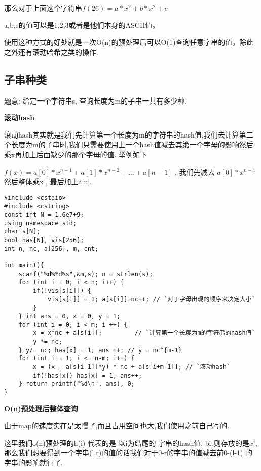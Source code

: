 那么对于上面这个字符串$f(26) = a*x^{2} + b*x^{2} + c$

a,b,c的值可以是1,2,3或者是他们本身的ASCII值。

使用这种方式的好处就是一次O(n)的预处理后可以O(1)查询任意字串的值，除此之外还有滚动哈希之类的操作.

\subsection{子串种类}

题意: 给定一个字符串s, 查询长度为m的子串一共有多少种.

{\bfseries 滚动hash}

滚动hash其实就是我们先计算第一个长度为m的字符串的hash值,我们去计算第二个长度为m的子串时,我们只需要使用上一个hash值减去其第一个字母的影响然后乘x再加上后面缺少的那个字母的值.  举例如下

$f(x) = a[0]*x^{n-1} + a[1]*x^{n-2} + ... + a[n-1] $ , 我们先减去 $a[0] * x^{n-1} $ 然后整体乘x , 最后加上a[n].

\begin{lstlisting}
#include <cstdio>
#include <cstring>
const int N = 1.6e7+9;
using namespace std;
char s[N];
bool has[N], vis[256];
int n, nc, a[256], m, cnt;

int main(){
    scanf("%d%*d%s",&m,s); n = strlen(s);
    for (int i = 0; i < n; i++) {
        if(!vis[s[i]]) {
            vis[s[i]] = 1; a[s[i]]=nc++; // `对于字母出现的顺序来决定大小`
        }
    } int ans = 0, x = 0, y = 1;
    for (int i = 0; i < m; i ++) {
        x = x*nc + a[s[i]];         // `计算第一个长度为m的字符串的hash值`
        y *= nc;
    } y/= nc; has[x] = 1; ans ++; // y = nc^{m-1}
    for (int i = 1; i <= n-m; i++) {
        x = (x - a[s[i-1]]*y) * nc + a[s[i+m-1]]; // `滚动hash`
        if(!has[x]) has[x] = 1, ans++;
    } return printf("%d\n", ans), 0;
}
\end{lstlisting}

{\bfseries O(n)预处理后整体查询}

由于map的速度实在是太慢了,而且占用空间也大,我们使用之前自己写的.

这里我们o(n)预处理的h(i) 代表的是 以i为结尾的 字串的hash值. bit则存放的是$x^i$, 那么我们想要得到一个字串(l,r)的值的话我们对于0-r的字串的值减去前0-(l-1) 的字串的影响就行了.

